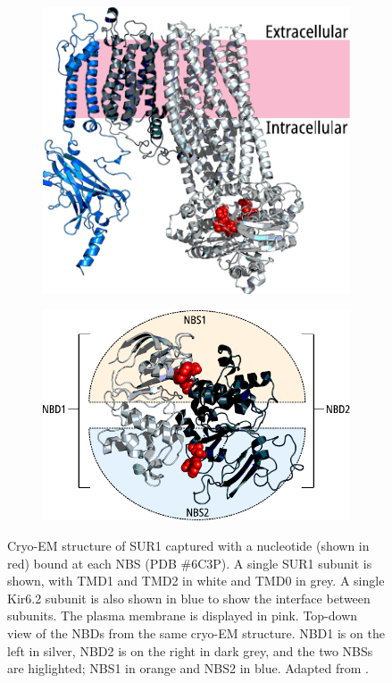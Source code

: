 \begin{figure}[h]
	\centering
	\begin{subfigure}[t]{0.4\textwidth}
		\caption{}\label{ch1fig:sur_struct}
		\centering
		\includegraphics[width=\textwidth]{sur_structure.pdf}
	\end{subfigure}
	\hfill
	\begin{subfigure}[t]{0.5\textwidth}
		\caption{}\label{ch1fig:nbd_struct}
		\centering
		\includegraphics[width=\textwidth]{nbd_structure.pdf}
	\end{subfigure}
	\caption[Structure of SUR1]{
		 Cryo-EM structure of SUR1 captured with a nucleotide (shown in red) bound at each NBS (PDB \#6C3P).
		A single SUR1 subunit is shown, with TMD1 and TMD2 in white and TMD0 in grey.
		A single Kir6.2 subunit is also shown in blue to show the interface between subunits.
		The plasma membrane is displayed in pink.
		 Top-down view of the NBDs from the same cryo-EM structure.
		NBD1 is on the left in silver, NBD2 is on the right in dark grey, and the two NBSs are higlighted; NBS1 in orange and NBS2 in blue.
		Adapted from \cite{puljung_cryo-electron_2018}.
	}
\end{figure}

